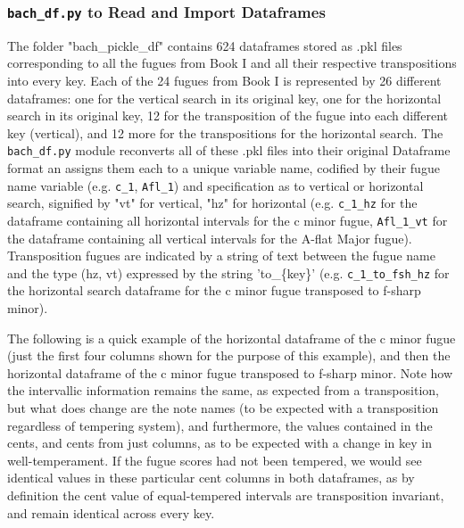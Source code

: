 \subsubsection{\texorpdfstring{\texttt{bach\_df.py} to Read and Import
Dataframes}{bach\_df.py to Read and Import Dataframes}}\label{bach_df.py-to-read-and-import-dataframes}

The folder "bach\_pickle\_df" contains 624 dataframes stored as .pkl
files corresponding to all the fugues from Book I and all their
respective transpositions into every key. Each of the 24 fugues from
Book I is represented by 26 different dataframes: one for the vertical
search in its original key, one for the horizontal search in its
original key, 12 for the transposition of the fugue into each different
key (vertical), and 12 more for the transpositions for the horizontal
search. The \texttt{bach\_df.py} module reconverts all of these .pkl
files into their original Dataframe format an assigns them each to a
unique variable name, codified by their fugue name variable (e.g.
\texttt{c\_1}, \texttt{Afl\_1}) and specification as to vertical or
horizontal search, signified by "vt" for vertical, "hz" for horizontal
(e.g. \texttt{c\_1\_hz} for the dataframe containing all horizontal
intervals for the c minor fugue, \texttt{Afl\_1\_vt} for the dataframe
containing all vertical intervals for the A-flat Major fugue).
Transposition fugues are indicated by a string of text between the fugue
name and the type (hz, vt) expressed by the string 'to\_\{key\}' (e.g.
\texttt{c\_1\_to\_fsh\_hz} for the horizontal search dataframe for the c
minor fugue transposed to f-sharp minor).

The following is a quick example of the horizontal dataframe of the c
minor fugue (just the first four columns shown for the purpose of this
example), and then the horizontal dataframe of the c minor fugue
transposed to f-sharp minor. Note how the intervallic information
remains the same, as expected from a transposition, but what does change
are the note names (to be expected with a transposition regardless of
tempering system), and furthermore, the values contained in the cents,
and cents from just columns, as to be expected with a change in key in
well-temperament. If the fugue scores had not been tempered, we would
see identical values in these particular cent columns in both
dataframes, as by definition the cent value of equal-tempered intervals
are transposition invariant, and remain identical across every key.

